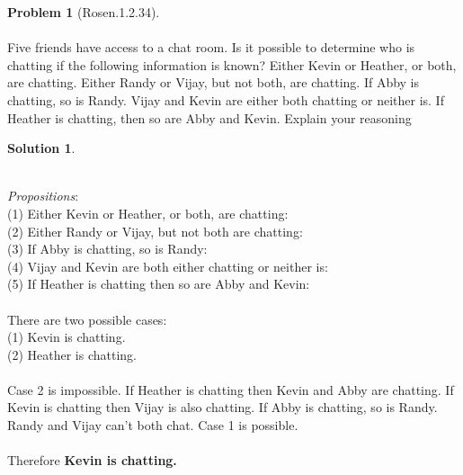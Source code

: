 \documentclass{article}
\theoremstyle{definition}
\newtheorem*{problem}{Problem}
\newtheorem*{solution}{Solution}
\begin{document}
\begin{problem}[Rosen.1.2.34]\ \\
\ \\
Five friends have access to a chat room. Is it possible to
determine who is chatting if the following information is
known? Either Kevin or Heather, or both, are chatting.
Either Randy or Vijay, but not both, are chatting. If Abby
is chatting, so is Randy. Vijay and Kevin are either both
chatting or neither is. If Heather is chatting, then so are
Abby and Kevin. Explain your reasoning\ \\
\begin{compactenum}
\renewcommand{\theenumi}{\alph{enumi}}
\end{compactenum}
\end{problem}

\begin{solution}\ \\
\ \\
\begin{compactenum}
\renewcommand{\theenumi}{\alph{enumi}} 
\textit{Propositions}:\ \\
(1) Either Kevin or Heather, or both, are chatting:\ \\
(2) Either Randy or Vijay, but not both are chatting: \ \\
(3) If Abby is chatting, so is Randy: \ \\
(4) Vijay and Kevin are both either chatting or neither is: \ \\
(5) If Heather is chatting then so are Abby and Kevin: \ \\
\ \\
There are two possible cases:\ \\
(1) Kevin is chatting.\ \\
(2) Heather is chatting.\ \\
\ \\
Case 2 is impossible. If Heather is chatting then Kevin and Abby are chatting. If Kevin is chatting then Vijay is also chatting. If Abby is chatting, so is Randy. Randy and Vijay can't both chat. Case 1 is possible.\ \\
\ \\
Therefore \textbf{Kevin is chatting.}\ \\




\end{compactenum}
\end{solution}
\end{document}
